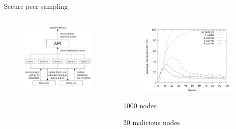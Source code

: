 \begin{frame}{Secure peer sampling}

\begin{columns}
\begin{column}{0.55\textwidth}
\begin{figure}
\includegraphics[width=\textwidth]{figs/11/sps-architecture}
\end{figure}
\end{column}
\begin{column}{0.45\textwidth}
\begin{figure}
\includegraphics[width=\textwidth]{figs/11/sps-results}
\end{figure}

\BI
\item 1000 nodes
\item 20 malicious nodes
\EI

\end{column}
\end{columns}


\end{frame}



